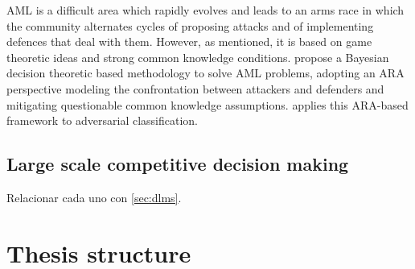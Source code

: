 AML is a  difficult area which rapidly evolves and leads to an 
arms race in which the community alternates cycles of proposing attacks and  of implementing defences that deal with them. However, as mentioned, it is 
based on game theoretic ideas and strong common
knowledge conditions. 
\cite{AMLARA} propose a
Bayesian decision theoretic based methodology 
to solve AML problems, 
adopting an ARA perspective \cite{adversarialRiskAnalysis2009,banks2015adversarial} modeling the confrontation between attackers and defenders and mitigating questionable common knowledge assumptions. \cite{math8111957} applies this ARA-based framework to  adversarial classification.





\subsection{Large scale competitive decision making}


Relacionar cada uno con \ref{sec:dlms}.


\section{Thesis structure}